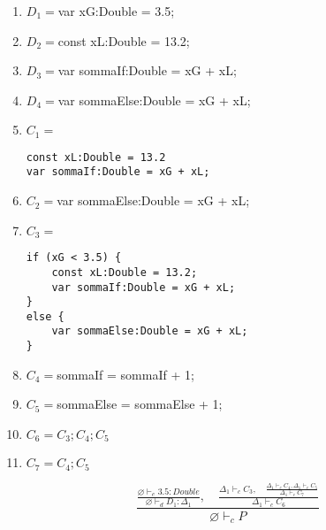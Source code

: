 \documentclass{article}
\begin{document}
\begin{enumerate}
    \item \(D_1 = \)\quad var xG:Double = 3.5;
    \item \(D_2 = \)\quad const xL:Double = 13.2;
    \item \(D_3 = \)\quad var sommaIf:Double = xG + xL;
    \item \(D_4 = \)\quad var sommaElse:Double = xG + xL;
    \item \(C_1 = \)\quad 
    \begin{verbatim}
const xL:Double = 13.2
var sommaIf:Double = xG + xL;
    \end{verbatim}
    \item \(C_2 = \)\quad var sommaElse:Double = xG + xL;
    \item \(C_3 = \)\quad
\begin{verbatim}
if (xG < 3.5) {
    const xL:Double = 13.2;
    var sommaIf:Double = xG + xL;
}
else {
    var sommaElse:Double = xG + xL;
}
\end{verbatim}
    \item \(C_4 = \)\quad sommaIf = sommaIf + 1;
    \item \(C_5 = \)\quad sommaElse = sommaElse + 1;
    \item \(C_6 = \)\quad \(C_3;C_4;C_5\)
    \item \(C_7 = \)\quad \(C_4;C_5\)
\end{enumerate}

\[
    \frac{
        \frac{\varnothing \vdash_e 3.5:Double}{\varnothing \vdash_d D_1 : \Delta_1},
        \quad
        \frac
        {
            \Delta_1 \vdash_c C_3,
            \quad
            \frac
            {\Delta_1 \vdash_c C_4, \Delta_1 \vdash_c C_5}
            {\Delta_1 \vdash_c C_7}
        }{\Delta_1 \vdash_c C_6}
    }{\varnothing \vdash_c P}
\]
\end{document}
